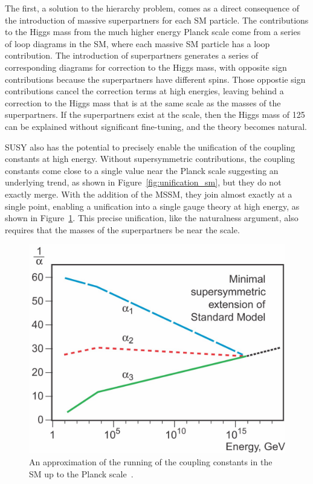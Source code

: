 The first, a solution to the hierarchy problem, comes as a direct consequence of the introduction of massive superpartners for each \ac{SM} particle.
The contributions to the Higgs mass from the much higher energy Planck scale come from a series of loop diagrams in the \ac{SM}, where each massive \ac{SM} particle has a loop contribution.
The introduction of superpartners generates a series of corresponding diagrams for correction to the Higgs mass, with opposite sign contributions because the superpartners have different spins.
Those oppostie sign contributions cancel the correction terms at high energies, leaving behind a correction to the Higgs mass that is at the same scale as the masses of the superpartners. 
If the superpartners exist at the \TeV scale, then the Higgs mass of 125 \GeV can be explained without significant fine-tuning, and the theory becomes natural.

\ac{SUSY} also has the potential to precisely enable the unification of the coupling constants at high energy.
Without supersymmetric contributions, the coupling constants come close to a single value near the Planck scale suggesting an underlying trend, as shown in Figure~\ref{fig:unification_sm}, but they do not exactly merge.
With the addition of the \ac{MSSM}, they join almost exactly at a single point, enabling a unification into a single gauge theory at high energy, as shown in Figure~\ref{fig:unification_susy}. 
This precise unification, like the naturalness argument, also requires that the masses of the superpartners be near the \TeV scale.

\begin{figure}
\includegraphics[width=\fullfig]{figures/unification_susy.jpg}
\caption{An approximation of the running of the coupling constants in the \ac{SM} up to the Planck scale~\cite{unification_plot}.}
\label{fig:unification_susy}
\end{figure}

